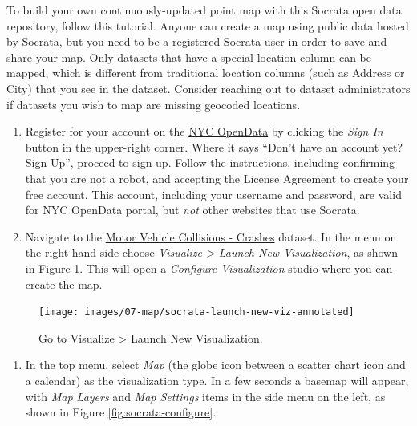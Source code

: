 \documentclass[
  english,
]{book}
\providecommand{\tightlist}{%
  \setlength{\itemsep}{0pt}\setlength{\parskip}{0pt}}
\begin{document}
To build your own continuously-updated point map with this Socrata open data repository, follow this tutorial. Anyone can create a map using public data hosted by Socrata, but you need to be a registered Socrata user in order to save and share your map. Only datasets that have a special location column can be mapped, which is different from traditional location columns (such as Address or City) that you see in the dataset. Consider reaching out to dataset administrators if datasets you wish to map are missing geocoded locations.

\begin{enumerate}
\def\labelenumi{\arabic{enumi}.}
\item
  Register for your account on the \href{https://opendata.cityofnewyork.us/}{NYC OpenData} by clicking the \emph{Sign In} button in the upper-right corner. Where it says ``Don't have an account yet? Sign Up'', proceed to sign up. Follow the instructions, including confirming that you are not a robot, and accepting the License Agreement to create your free account. This account, including your username and password, are valid for NYC OpenData portal, but \emph{not} other websites that use Socrata.
\item
  Navigate to the \href{https://data.cityofnewyork.us/Public-Safety/Motor-Vehicle-Collisions-Crashes/h9gi-nx95/data}{Motor Vehicle Collisions - Crashes} dataset. In the menu on the right-hand side choose \emph{Visualize \textgreater{} Launch New Visualization}, as shown in Figure \ref{fig:socrata-launch-new-viz}. This will open a \emph{Configure Visualization} studio where you can create the map.
\end{enumerate}



\begin{figure}
\texttt{[image: images/07-map/socrata-launch-new-viz-annotated]} \caption{Go to Visualize \textgreater{} Launch New Visualization.}\label{fig:socrata-launch-new-viz}
\end{figure}

\begin{enumerate}
\def\labelenumi{\arabic{enumi}.}
\setcounter{enumi}{2}
\tightlist
\item
  In the top menu, select \emph{Map} (the globe icon between a scatter chart icon and a calendar) as the visualization type. In a few seconds a basemap will appear, with \emph{Map Layers} and \emph{Map Settings} items in the side menu on the left, as shown in Figure \ref{fig:socrata-configure}.
\end{enumerate}
\end{document}

